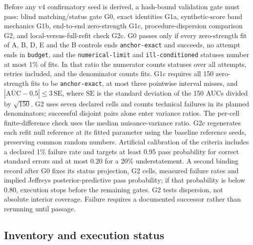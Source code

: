 Before any v4 confirmatory seed is derived, a hash-bound validation gate must pass: blind matching/status gate G0, exact identities G1a, synthetic-score band mechanics G1b, end-to-end zero-strength G1c, procedure-dispersion comparison G2, and local-versus-full-refit check G2c. %
G0 passes only if every zero-strength fit of A, B, D, E and the B controls ends \texttt{anchor-exact} and succeeds, no attempt ends in \texttt{budget}, and the \texttt{numerical-limit} and \texttt{ill-conditioned} statuses number at most 1\% of fits. %
In that ratio the numerator counts statuses over all attempts, retries included, and the denominator counts fits. %
G1c requires all 150 zero-strength fits to be \texttt{anchor-exact}, at most three pointwise interval misses, and $|\overline{\mathrm{AUC}}-0.5|\leq3\,\mathrm{SE}$, where $\mathrm{SE}$ is the standard deviation of the 150 AUCs divided by $\sqrt{150}$. %
G2 uses seven declared cells and counts technical failures in its planned denominators; successful disjoint pairs alone enter variance ratios. %
The per-cell finite-difference check uses the median nuisance-variance ratio. %
G2c regenerates each refit null reference at its fitted parameter using the baseline reference seeds, preserving common random numbers. %
Artificial calibration of the criteria includes a declared 1\% failure rate and targets at least 0.95 pass probability for correct standard errors and at most 0.20 for a 20\% understatement. %
A second binding record after G0 fixes its status projection, G2 cells, measured failure rates and implied Jeffreys posterior-predictive pass probability; if that probability is below 0.80, execution stops before the remaining gates. %
G2 tests dispersion, not absolute interior coverage. %
Failure requires a documented successor rather than rerunning until passage. %

\subsection{Inventory and execution status}

